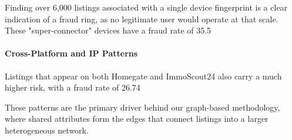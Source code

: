 Finding over 6,000 listings associated with a single device fingerprint is a clear indication of a fraud ring, as no legitimate user would operate at that scale. These "super-connector" devices have a fraud rate of 35.5%

\paragraph{Cross-Platform and IP Patterns}
Listings that appear on both Homegate and ImmoScout24 also carry a much higher risk, with a fraud rate of 26.74%

These patterns are the primary driver behind our graph-based methodology, where shared attributes form the edges that connect listings into a larger heterogeneous network.
